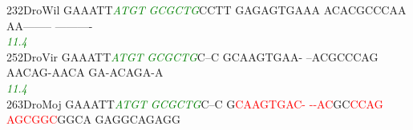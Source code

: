 \documentclass[11pt,twoside,reqno,a4paper]{article}
\begin{document}
{232\hspace*{1\charwidth}DroWil	GAAATT\textit{\textcolor{green}{A}}\textit{\textcolor{green}{T}}\textit{\textcolor{green}{G}}\textit{\textcolor{green}{T}}	\textit{\textcolor{green}{G}}\textit{\textcolor{green}{C}}\textit{\textcolor{green}{G}}\textit{\textcolor{green}{C}}\textit{\textcolor{green}{T}}\textit{\textcolor{green}{G}}CCTT	GAGAGTGAAA	ACACGCCCAA	AA--------	----------	\\
\hspace*{4\charwidth}\hspace*{7\charwidth}\hspace*{6\charwidth}\textit{\textcolor{green}{11.4}}\hspace*{1\charwidth}\hspace*{1\charwidth}\hspace*{1\charwidth}\hspace*{1\charwidth}\hspace*{1\charwidth}\hspace*{1\charwidth}\\
252\hspace*{1\charwidth}DroVir	GAAATT\textit{\textcolor{green}{A}}\textit{\textcolor{green}{T}}\textit{\textcolor{green}{G}}\textit{\textcolor{green}{T}}	\textit{\textcolor{green}{G}}\textit{\textcolor{green}{C}}\textit{\textcolor{green}{G}}\textit{\textcolor{green}{C}}\textit{\textcolor{green}{T}}\textit{\textcolor{green}{G}}C--C	GCAAGTGAA-	--ACGCCCAG	AACAG-AACA	GA-ACAGA-A	\\
\hspace*{4\charwidth}\hspace*{7\charwidth}\hspace*{6\charwidth}\textit{\textcolor{green}{11.4}}\hspace*{1\charwidth}\hspace*{1\charwidth}\hspace*{1\charwidth}\hspace*{1\charwidth}\hspace*{1\charwidth}\hspace*{1\charwidth}\\
263\hspace*{1\charwidth}DroMoj	GAAATT\textit{\textcolor{green}{A}}\textit{\textcolor{green}{T}}\textit{\textcolor{green}{G}}\textit{\textcolor{green}{T}}	\textit{\textcolor{green}{G}}\textit{\textcolor{green}{C}}\textit{\textcolor{green}{G}}\textit{\textcolor{green}{C}}\textit{\textcolor{green}{T}}\textit{\textcolor{green}{G}}C--C	G\textcolor{red}{C}\textcolor{red}{A}\textcolor{red}{A}\textcolor{red}{G}\textcolor{red}{T}\textcolor{red}{G}\textcolor{red}{A}\textcolor{red}{C}\textcolor{red}{-}	\textcolor{red}{-}\textcolor{red}{-}\textcolor{red}{A}\textcolor{red}{C}GC\textcolor{red}{C}\textcolor{red}{C}\textcolor{red}{A}\textcolor{red}{G}	\textcolor{red}{A}\textcolor{red}{G}\textcolor{red}{C}\textcolor{red}{G}\textcolor{red}{G}\textcolor{red}{C}GGCA	GAGGCAGAGG	\\
}
\end{document}
